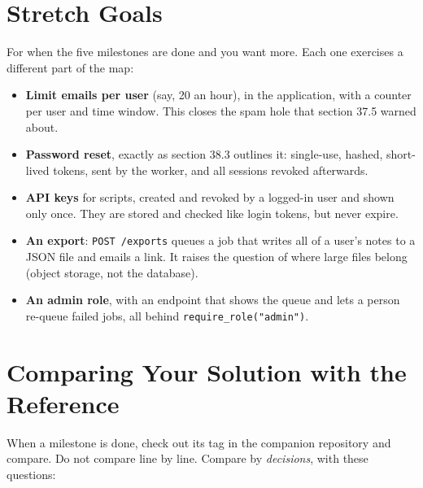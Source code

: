\setcounter{section}{6}
\section{Stretch Goals}\label{44-project-notes-for-many-users:447-stretch-goals}

For when the five milestones are done and you want more. Each one exercises a different part of the map:

\begin{itemize}
\tightlist
\item
  \textbf{Limit emails per user} (say, 20 an hour), in the application, with a counter per user and time window. This closes the spam hole that section 37.5 warned about.
\item
  \textbf{Password reset}, exactly as section 38.3 outlines it: single-use, hashed, short-lived tokens, sent by the worker, and all sessions revoked afterwards.
\item
  \textbf{API keys} for scripts, created and revoked by a logged-in user and shown only once. They are stored and checked like login tokens, but never expire.
\item
  \textbf{An export}: \texttt{POST\ /exports} queues a job that writes all of a user's notes to a JSON file and emails a link. It raises the question of where large files belong (object storage, not the database).
\item
  \textbf{An admin role}, with an endpoint that shows the queue and lets a person re-queue failed jobs, all behind \texttt{require\_role("admin")}.
\end{itemize}

\setcounter{section}{7}
\section{Comparing Your Solution with the Reference}\label{44-project-notes-for-many-users:448-comparing-your-solution-with-the-reference}

When a milestone is done, check out its tag in the companion repository and compare. Do not compare line by line. Compare by \emph{decisions}, with these questions:


